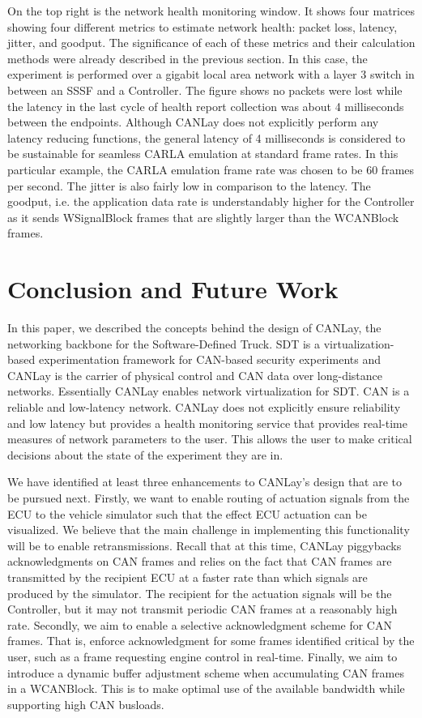 \documentclass[letterpaper,twocolumn,12pt]{article}
\begin{document}
On the top right is the network health monitoring window. It shows four matrices showing
four different metrics to estimate network health: packet loss, latency, jitter, and goodput. The significance of each of these metrics and their calculation methods were already described in the previous section. In this case, the experiment is performed over a gigabit local area network with a layer 3 switch in between an SSSF and a Controller. The figure shows no packets were lost while the latency in the last cycle of health report collection was about 4 milliseconds between the endpoints. Although CANLay does not explicitly perform any latency reducing functions, the general latency of 4 milliseconds is considered to be sustainable for seamless CARLA emulation at standard frame rates. In this particular example, the CARLA emulation frame rate was chosen to be 60 frames per second. The jitter is also fairly low in comparison to the latency. The goodput, i.e. the application data rate is understandably higher for the Controller as it sends WSignalBlock frames that are slightly larger than the WCANBlock frames. 

\section{Conclusion and Future Work}
In this paper, we described the concepts behind the design of CANLay, the networking backbone for the Software-Defined Truck. 
SDT is a virtualization-based experimentation framework for CAN-based security experiments and CANLay is the carrier of physical control and CAN data over long-distance networks. Essentially CANLay enables network virtualization for SDT. CAN is a reliable and low-latency network. CANLay does not explicitly ensure reliability and low latency but provides a health monitoring service that provides real-time measures of network parameters to the user. This allows the user to make critical decisions about the state of the experiment they are in.

We have identified at least three enhancements to CANLay's design that are to be pursued next. 
Firstly, we want to enable routing of actuation signals from the ECU to the vehicle simulator such that the effect ECU actuation can be visualized. We believe that the main challenge in implementing this functionality will be to enable retransmissions. Recall that at this time, CANLay piggybacks acknowledgments on CAN frames and relies on the fact that CAN frames are transmitted by the recipient ECU at a faster rate than which signals are produced by the simulator. The recipient for the actuation signals will be the Controller, but it may not transmit periodic CAN frames at a reasonably high rate. 
Secondly, we aim to enable a selective acknowledgment scheme for CAN frames. That is, enforce acknowledgment for some frames identified critical by the user, such as a frame requesting engine control in real-time. 
Finally, we aim to introduce a dynamic buffer adjustment scheme when accumulating CAN frames in a WCANBlock. This is to make optimal use of the available bandwidth while supporting high CAN busloads.

 



\end{document}
